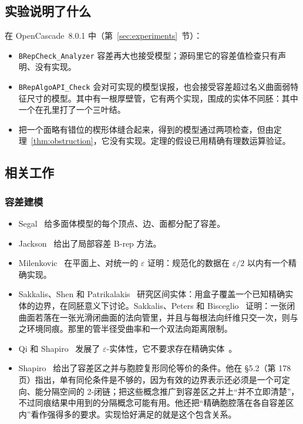 \subsection{实验说明了什么}
在 OpenCascade~8.0.1 中（第~\ref{sec:experiments}~节）：
\begin{itemize}
\item \texttt{BRepCheck\_Analyzer} 容差再大也接受模型；源码里它的容差值检查只有声明、没有实现。
\item \texttt{BRepAlgoAPI\_Check} 会对可实现的模型误报，也会接受容差超过名义曲面弱特征尺寸的模型。其中有一根厚壁管，它有两个实现，围成的实体不同胚：其中一个在孔里打了一个三叶结。
\item 把一个面略有错位的楔形体缝合起来，得到的模型通过两项检查，但由定理~\ref{thm:obstruction}，它没有实现。定理的假设已用精确有理数运算验证。
\end{itemize}

\subsection{相关工作}

\subsubsection*{容差建模}
\begin{itemize}
\item Segal~\cite{Segal90} 给多面体模型的每个顶点、边、面都分配了容差。
\item Jackson~\cite{Jackson95} 给出了局部容差 B-rep 方法。
\item Milenkovic~\cite{Milenkovic88} 在平面上、对统一的 $\varepsilon$ 证明：规范化的数据在 $\varepsilon/2$ 以内有一个精确实现。
\item Sakkalis、Shen 和 Patrikalakis~\cite{SSP01} 研究区间实体：用盒子覆盖一个已知精确实体的边界，在同胚意义下讨论。Sakkalis、Peters 和 Bisceglio~\cite[Thm.~10]{SPB04} 证明：一张闭曲面若落在一张光滑闭曲面的法向管里，并且与每根法向纤维只交一次，则与之环境同痕。那里的管半径受曲率和一个双法向距离限制。
\item Qi 和 Shapiro~\cite{QiShapiro06} 发展了 $\varepsilon$-实体性，它不要求存在精确实体~\cite{QiShapiro06b}。
\item Shapiro~\cite{Shapiro08} 给出了容差区之并与胞腔复形同伦等价的条件。他在 \S5.2（第 178 页）指出，单有同伦条件是不够的，因为有效的边界表示还必须是一个可定向、能分隔空间的 2-闭链；把这些概念推广到容差区之并上``并不立即清楚''，不过同痕结果中用到的分隔概念可能有用。他还把``精确胞腔落在各自容差区内''看作强得多的要求。实现恰好满足的就是这个包含关系。
\end{itemize}

